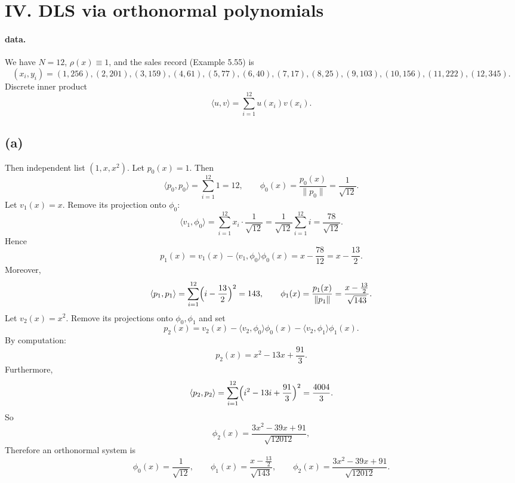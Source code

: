 \documentclass[a4paper]{article}
\begin{document}
\section*{IV. DLS via orthonormal polynomials}
\paragraph{data.}
We have $N=12$, $\rho(x)\equiv 1$, and the sales record (Example 5.55) is
\[
(x_i,y_i)=
(1,256),(2,201),(3,159),(4,61),(5,77),(6,40),(7,17),(8,25),(9,103),(10,156),(11,222),(12,345).
\]
Discrete inner product
\[
\langle u,v\rangle=\sum_{i=1}^{12} u(x_i)v(x_i).
\]

\subsection*{(a)}
Then independent list $(1,x,x^2)$.
Let $p_0(x)=1$. Then
\[
\langle p_0,p_0\rangle=\sum_{i=1}^{12}1=12,
\qquad
\phi_0(x)=\frac{p_0(x)}{\|p_0\|}=\frac{1}{\sqrt{12}}.
\]
Let $v_1(x)=x$. Remove its projection onto $\phi_0$:
\[
\langle v_1,\phi_0\rangle=\sum_{i=1}^{12} x_i\cdot \frac{1}{\sqrt{12}}
=\frac{1}{\sqrt{12}}\sum_{i=1}^{12} i
=\frac{78}{\sqrt{12}}.
\]
Hence
\[
p_1(x)=v_1(x)-\langle v_1,\phi_0\rangle \phi_0(x)
=x-\frac{78}{12}=x-\frac{13}{2}.
\]
Moreover,
\[
\langle p_1,p_1\rangle=\sum_{i=1}^{12}\Bigl(i-\frac{13}{2}\Bigr)^2=143,
\qquad
\phi_1(x)=\frac{p_1(x)}{\|p_1\|}=\frac{x-\frac{13}{2}}{\sqrt{143}}.
\]
Let $v_2(x)=x^2$. Remove its projections onto $\phi_0,\phi_1$ and set
\[
p_2(x)=v_2(x)-\langle v_2,\phi_0\rangle\phi_0(x)-\langle v_2,\phi_1\rangle\phi_1(x).
\]
By computation:
\[
p_2(x)=x^2-13x+\frac{91}{3}.
\]
Furthermore,
\[
\langle p_2,p_2\rangle=\sum_{i=1}^{12}\Bigl(i^2-13i+\frac{91}{3}\Bigr)^2=\frac{4004}{3}.
\]
So
\[
\phi_2(x)
=\frac{3x^2-39x+91}{\sqrt{12012}},
\]
\noindent Therefore an orthonormal system is
\[
\boxed{
\phi_0(x)=\frac1{\sqrt{12}},\qquad
\phi_1(x)=\frac{x-\frac{13}{2}}{\sqrt{143}},\qquad
\phi_2(x)=\frac{3x^2-39x+91}{\sqrt{12012}}.
}
\]
\end{document}
